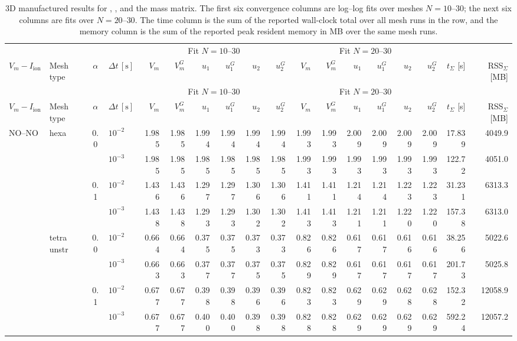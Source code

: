 \tiny
\setlength{\tabcolsep}{1.7pt}
\begin{longtable}{llclrrrrrrrrrrrrrr}
\caption{3D manufactured results for , , and the  mass matrix. The first six convergence columns are log--log fits over meshes $N=10$--$30$; the next six columns are fits over $N=20$--$30$. The time column is the sum of the reported wall-clock total over all mesh runs in the row, and the memory column is the sum of the reported peak resident memory in MB over the same mesh runs.}\label{tab:results-3d-diagonaliion-cn-cons}\\
\toprule
& & & & \multicolumn{6}{c}{Fit $N=10$--$30$} & \multicolumn{6}{c}{Fit $N=20$--$30$} & & \\
\cmidrule(lr){5-10}\cmidrule(lr){11-16}
$V_m-I_{\mathrm{ion}}$ & Mesh type & $\alpha$ & $\Delta t\,[\text{s}]$ & $V_m$ & $V_m^G$ & $u_1$ & $u_1^G$ & $u_2$ & $u_2^G$ & $V_m$ & $V_m^G$ & $u_1$ & $u_1^G$ & $u_2$ & $u_2^G$ & $t_{\Sigma}$ [s] & RSS$_{\Sigma}$ [MB] \\
\midrule
\endfirsthead
\toprule
& & & & \multicolumn{6}{c}{Fit $N=10$--$30$} & \multicolumn{6}{c}{Fit $N=20$--$30$} & & \\
\cmidrule(lr){5-10}\cmidrule(lr){11-16}
$V_m-I_{\mathrm{ion}}$ & Mesh type & $\alpha$ & $\Delta t\,[\text{s}]$ & $V_m$ & $V_m^G$ & $u_1$ & $u_1^G$ & $u_2$ & $u_2^G$ & $V_m$ & $V_m^G$ & $u_1$ & $u_1^G$ & $u_2$ & $u_2^G$ & $t_{\Sigma}$ [s] & RSS$_{\Sigma}$ [MB] \\
\midrule
\endhead
\multirow{8}{*}{NO--NO} & \multirow{4}{*}{hexa} & \multirow{2}{*}{0.0} & $10^{-2}$ & 1.985 & 1.985 & 1.994 & 1.994 & 1.994 & 1.994 & 1.993 & 1.993 & 2.009 & 2.009 & 2.009 & 2.009 & 17.839 & 4049.9 \\
& & & $10^{-3}$ & 1.985 & 1.985 & 1.985 & 1.985 & 1.985 & 1.985 & 1.993 & 1.993 & 1.993 & 1.993 & 1.993 & 1.993 & 122.72 & 4051.0 \\\cline{3-18}
& & \multirow{2}{*}{0.1} & $10^{-2}$ & 1.436 & 1.436 & 1.297 & 1.297 & 1.306 & 1.306 & 1.411 & 1.411 & 1.214 & 1.214 & 1.223 & 1.223 & 31.231 & 6313.3 \\
& & & $10^{-3}$ & 1.438 & 1.438 & 1.293 & 1.293 & 1.302 & 1.302 & 1.413 & 1.413 & 1.211 & 1.211 & 1.220 & 1.220 & 157.38 & 6313.0 \\\cline{2-18}
& \multirow{4}{*}{tetra unstr} & \multirow{2}{*}{0.0} & $10^{-2}$ & 0.664 & 0.664 & 0.375 & 0.375 & 0.373 & 0.373 & 0.826 & 0.826 & 0.617 & 0.617 & 0.616 & 0.616 & 38.256 & 5022.6 \\
& & & $10^{-3}$ & 0.663 & 0.663 & 0.377 & 0.377 & 0.375 & 0.375 & 0.829 & 0.829 & 0.617 & 0.617 & 0.617 & 0.617 & 201.73 & 5025.8 \\\cline{3-18}
& & \multirow{2}{*}{0.1} & $10^{-2}$ & 0.677 & 0.677 & 0.398 & 0.398 & 0.396 & 0.396 & 0.823 & 0.823 & 0.629 & 0.629 & 0.628 & 0.628 & 152.32 & 12058.9 \\
& & & $10^{-3}$ & 0.677 & 0.677 & 0.400 & 0.400 & 0.398 & 0.398 & 0.828 & 0.828 & 0.629 & 0.629 & 0.629 & 0.629 & 592.24 & 12057.2 \\\hline


\end{longtable}

